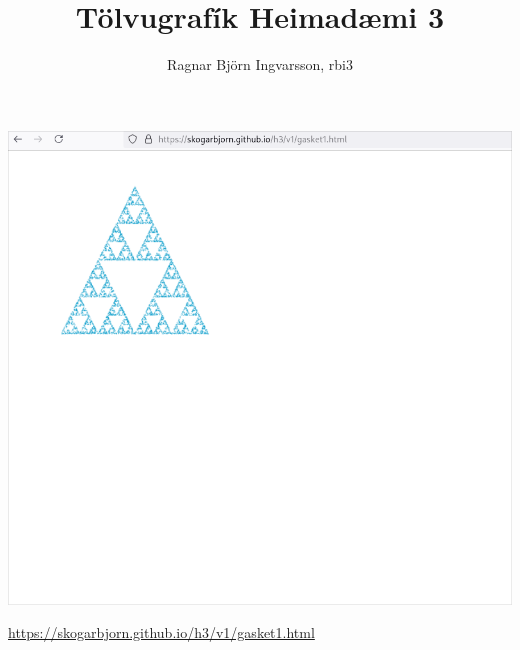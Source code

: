 \documentclass{article}
\title{Tölvugrafík Heimadæmi 3}
\author{Ragnar Björn Ingvarsson, rbi3}
\begin{document}
\renewcommand\thepage{}
	
	\maketitle

	\newpage
	\setcounter{page}{1}
	\renewcommand\thepage{\arabic{page}}

	\section{}
	\begin{center}
		\includegraphics[scale=0.35]{sierpinski.png}
	\end{center}
	\url{https://skogarbjorn.github.io/h3/v1/gasket1.html}
\end{document}
